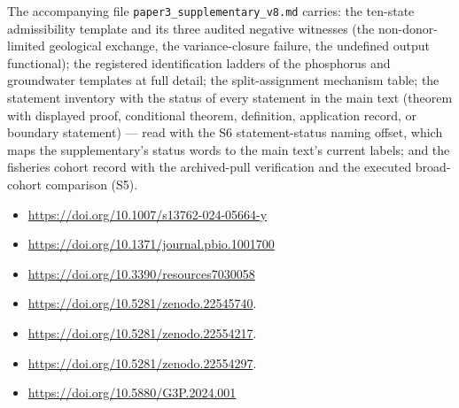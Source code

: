 \documentclass[11pt]{article}
\begin{document}
The accompanying file \texttt{paper3\_suppl\allowbreak{}ementary\_v8.\allowbreak{}md} carries: the ten-state admissibility template and its three audited negative witnesses (the non-donor-limited geological exchange, the variance-closure failure, the undefined output functional); the registered identification ladders of the phosphorus and groundwater templates at full detail; the split-assignment mechanism table; the statement inventory with the status of every statement in the main text (theorem with displayed proof, conditional theorem, definition, application record, or boundary statement) --- read with the S6 statement-status naming offset, which maps the supplementary's status words to the main text's current labels; and the fisheries cohort record with the archived-pull verification and the executed broad-cohort comparison (S5).

\begin{itemize}\setlength{\itemsep}{2pt}
\item \url{https://doi.org/10.1007/s13762-024-05664-y}
\item \url{https://doi.org/10.1371/journal.pbio.1001700}
\item \url{https://doi.org/10.3390/resources7030058}
\item \url{https://doi.org/10.5281/zenodo.22545740}.
\item \url{https://doi.org/10.5281/zenodo.22554217}.
\item \url{https://doi.org/10.5281/zenodo.22554297}.
\item \url{https://doi.org/10.5880/G3P.2024.001}
\end{itemize}
\end{document}
